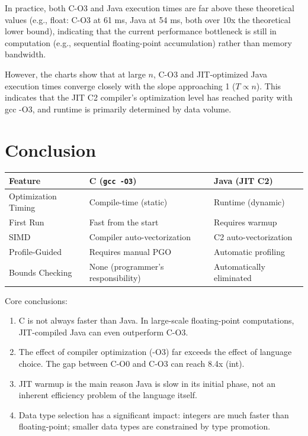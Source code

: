\documentclass[12pt,a4paper]{article}
\begin{document}
In practice, both C-O3 and Java execution times are far above these theoretical values (e.g., float: C-O3 at 61 ms, Java at 54 ms, both over 10x the theoretical lower bound), indicating that the current performance bottleneck is still in computation (e.g., sequential floating-point accumulation) rather than memory bandwidth.

However, the charts show that at large $n$, C-O3 and JIT-optimized Java execution times converge closely with the slope approaching 1 ($T \propto n$). This indicates that the JIT C2 compiler's optimization level has reached parity with gcc -O3, and runtime is primarily determined by data volume.

\section{Conclusion}

\begin{table}[H]
\centering
\begin{tabular}{l l l}
\toprule
Feature & C (\texttt{gcc -O3}) & Java (JIT C2) \\
\midrule
Optimization Timing  & Compile-time (static)      & Runtime (dynamic) \\
First Run            & Fast from the start        & Requires warmup \\
SIMD                 & Compiler auto-vectorization & C2 auto-vectorization \\
Profile-Guided       & Requires manual PGO         & Automatic profiling \\
Bounds Checking      & None (programmer's responsibility) & Automatically eliminated \\
\bottomrule
\end{tabular}
\end{table}

Core conclusions:

\begin{enumerate}
  \item C is not always faster than Java. In large-scale floating-point computations, JIT-compiled Java can even outperform C-O3.
  \item The effect of compiler optimization (-O3) far exceeds the effect of language choice. The gap between C-O0 and C-O3 can reach 8.4x (int).
  \item JIT warmup is the main reason Java is slow in its initial phase, not an inherent efficiency problem of the language itself.
  \item Data type selection has a significant impact: integers are much faster than floating-point; smaller data types are constrained by type promotion.
\end{enumerate}
\end{document}
